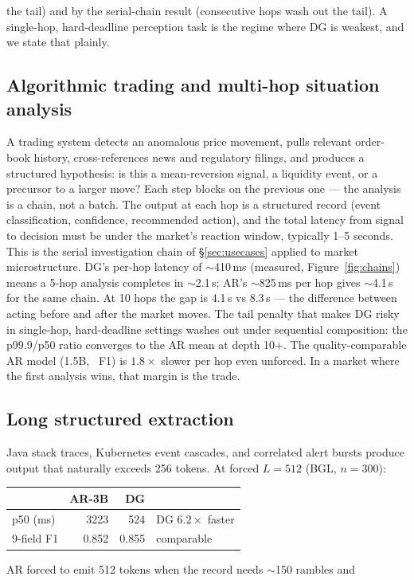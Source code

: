 the tail) and by the serial-chain result (consecutive hops wash out the
tail). A single-hop, hard-deadline perception task is the regime where DG
is weakest, and we state that plainly. \subsection{Algorithmic trading and multi-hop situation analysis} A trading system detects an anomalous price movement, pulls relevant
order-book history, cross-references news and regulatory filings, and
produces a structured hypothesis: is this a mean-reversion signal, a
liquidity event, or a precursor to a larger move? Each step blocks on the
previous one --- the analysis is a chain, not a batch. The output at each
hop is a structured record (event classification, confidence, recommended
action), and the total latency from signal to decision must be under the
market's reaction window, typically 1--5 seconds. This is the serial investigation chain of \S\ref{sec:usecases} applied to
market microstructure. DG's per-hop latency of $\sim$410\,ms (measured,
Figure~\ref{fig:chains}) means a 5-hop analysis completes in
$\sim$2.1\,s; AR's $\sim$825\,ms per hop gives $\sim$4.1\,s for the same
chain. At 10 hops the gap is 4.1\,s vs 8.3\,s --- the difference between
acting before and after the market moves. The tail penalty that makes DG
risky in single-hop, hard-deadline settings washes out under sequential
composition: the p99.9/p50 ratio converges to the AR mean at depth 10+. The quality-comparable AR model (1.5B, \arOneFiveFnine\ F1) is $1.8\times$
slower per hop even unforced. In a market where the first analysis wins,
that margin is the trade. \subsection{Long structured extraction} Java stack traces, Kubernetes event cascades, and correlated alert bursts
produce output that naturally exceeds 256 tokens. At forced $L{=}512$
(BGL, $n{=}300$): \begin{center}
\begin{tabular}{@{}lrrl@{}}
\toprule & AR-3B & DG & \\
\midrule
p50 (ms) & 3223 & 524 & DG $6.2\times$ faster \\
9-field F1 & 0.852 & 0.855 & comparable \\
\bottomrule
\end{tabular}
\end{center} AR forced to emit 512 tokens when the record needs $\sim$150 rambles and
